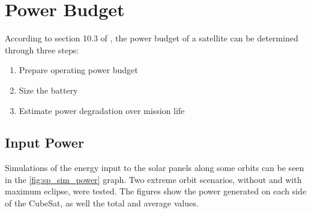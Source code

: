 \section{Power Budget} \label{power-budget}

According to section 10.3 of \cite{larson2005}, the power budget of a satellite can be determined through three steps:

\begin{enumerate}
    \item Prepare operating power budget
    \item Size the battery
    \item Estimate power degradation over mission life
\end{enumerate}

\subsection{Input Power}

Simulations of the energy input to the solar panels along some orbits can be seen in the \autoref{fig:sp_sim_power} graph. Two extreme orbit scenarios, without and with maximum eclipse, were tested. The figures show the power generated on each side of the CubeSat, as well the total and average values.

